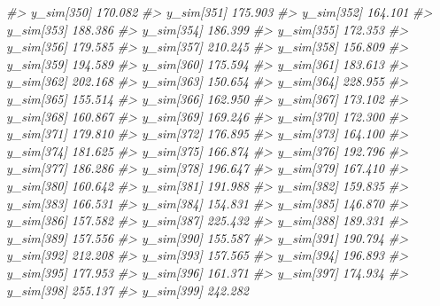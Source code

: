 \documentclass[
  10pt,
  italian,
  a4paper,
  extrafontsizes,onecolumn,openright
  ]{memoir}
\newenvironment{Shaded}{\begin{snugshade}}{\end{snugshade}}
\newcommand{\CommentTok}[1]{\textcolor[rgb]{0.56,0.35,0.01}{\textit{#1}}}
\begin{document}
\begin{Shaded}
\begin{Highlighting}[]
\CommentTok{\#\textgreater{}   y\_sim[350] 170.082}
\CommentTok{\#\textgreater{}   y\_sim[351] 175.903}
\CommentTok{\#\textgreater{}   y\_sim[352] 164.101}
\CommentTok{\#\textgreater{}   y\_sim[353] 188.386}
\CommentTok{\#\textgreater{}   y\_sim[354] 186.399}
\CommentTok{\#\textgreater{}   y\_sim[355] 172.353}
\CommentTok{\#\textgreater{}   y\_sim[356] 179.585}
\CommentTok{\#\textgreater{}   y\_sim[357] 210.245}
\CommentTok{\#\textgreater{}   y\_sim[358] 156.809}
\CommentTok{\#\textgreater{}   y\_sim[359] 194.589}
\CommentTok{\#\textgreater{}   y\_sim[360] 175.594}
\CommentTok{\#\textgreater{}   y\_sim[361] 183.613}
\CommentTok{\#\textgreater{}   y\_sim[362] 202.168}
\CommentTok{\#\textgreater{}   y\_sim[363] 150.654}
\CommentTok{\#\textgreater{}   y\_sim[364] 228.955}
\CommentTok{\#\textgreater{}   y\_sim[365] 155.514}
\CommentTok{\#\textgreater{}   y\_sim[366] 162.950}
\CommentTok{\#\textgreater{}   y\_sim[367] 173.102}
\CommentTok{\#\textgreater{}   y\_sim[368] 160.867}
\CommentTok{\#\textgreater{}   y\_sim[369] 169.246}
\CommentTok{\#\textgreater{}   y\_sim[370] 172.300}
\CommentTok{\#\textgreater{}   y\_sim[371] 179.810}
\CommentTok{\#\textgreater{}   y\_sim[372] 176.895}
\CommentTok{\#\textgreater{}   y\_sim[373] 164.100}
\CommentTok{\#\textgreater{}   y\_sim[374] 181.625}
\CommentTok{\#\textgreater{}   y\_sim[375] 166.874}
\CommentTok{\#\textgreater{}   y\_sim[376] 192.796}
\CommentTok{\#\textgreater{}   y\_sim[377] 186.286}
\CommentTok{\#\textgreater{}   y\_sim[378] 196.647}
\CommentTok{\#\textgreater{}   y\_sim[379] 167.410}
\CommentTok{\#\textgreater{}   y\_sim[380] 160.642}
\CommentTok{\#\textgreater{}   y\_sim[381] 191.988}
\CommentTok{\#\textgreater{}   y\_sim[382] 159.835}
\CommentTok{\#\textgreater{}   y\_sim[383] 166.531}
\CommentTok{\#\textgreater{}   y\_sim[384] 154.831}
\CommentTok{\#\textgreater{}   y\_sim[385] 146.870}
\CommentTok{\#\textgreater{}   y\_sim[386] 157.582}
\CommentTok{\#\textgreater{}   y\_sim[387] 225.432}
\CommentTok{\#\textgreater{}   y\_sim[388] 189.331}
\CommentTok{\#\textgreater{}   y\_sim[389] 157.556}
\CommentTok{\#\textgreater{}   y\_sim[390] 155.587}
\CommentTok{\#\textgreater{}   y\_sim[391] 190.794}
\CommentTok{\#\textgreater{}   y\_sim[392] 212.208}
\CommentTok{\#\textgreater{}   y\_sim[393] 157.565}
\CommentTok{\#\textgreater{}   y\_sim[394] 196.893}
\CommentTok{\#\textgreater{}   y\_sim[395] 177.953}
\CommentTok{\#\textgreater{}   y\_sim[396] 161.371}
\CommentTok{\#\textgreater{}   y\_sim[397] 174.934}
\CommentTok{\#\textgreater{}   y\_sim[398] 255.137}
\CommentTok{\#\textgreater{}   y\_sim[399] 242.282}

\end{Highlighting}
\end{Shaded}
\end{document}

